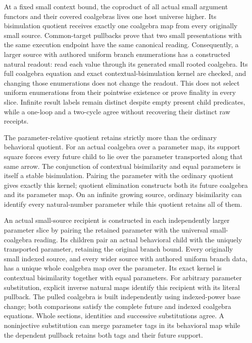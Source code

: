 \documentclass[11pt]{article}
\theoremstyle{definition}
\theoremstyle{remark}
\begin{document}
At a fixed small context bound, the coproduct of all actual small
argument functors and their covered coalgebras lives one host universe
higher.  Its bisimulation quotient receives exactly one coalgebra map
from every originally small source.  Common-target pullbacks prove
that two small presentations with the same execution endpoint have the
same canonical reading.  Consequently, a larger source with authored
uniform branch enumerations has a constructed natural readout: read
each value through its generated small rooted coalgebra.  Its full
coalgebra equation and exact contextual-bisimulation kernel are checked,
and changing those enumerations does not change the readout.  This
does not select uniform enumerations from their pointwise existence or
prove finality in every slice.  Infinite result labels remain distinct
despite empty present child predicates, while a one-loop and a two-cycle
agree without recovering their distinct raw receipts.

The parameter-relative quotient retains strictly more than the ordinary
behavioral quotient.  For an actual coalgebra over a parameter map, its
support square forces every future child to lie over the parameter
transported along that same arrow.  The conjunction of contextual
bisimilarity and equal parameters is itself a stable bisimulation.  Pairing
the parameter with the ordinary quotient gives exactly this kernel;
quotient elimination constructs both its future coalgebra and its parameter
map.  On an infinite growing source, ordinary bisimilarity can identify
every natural-number parameter while this quotient retains all of them.

An actual small-source recipient is constructed in each independently
larger parameter slice by pairing the retained parameter with the universal
small-coalgebra reading.  Its children pair an actual behavioral child with
the uniquely transported parameter, retaining the original branch bound.
Every originally small indexed source, and every wider source with authored
uniform branch data, has a unique whole coalgebra map over the parameter.
Its exact kernel is contextual bisimilarity together with equal parameters.
For arbitrary parameter substitution, explicit inverse natural maps identify
this recipient with its literal pullback.  The pulled coalgebra is built
independently using indexed-power base change; both comparisons satisfy the
complete future and indexed coalgebra equations.  Whole sections, identities
and successive substitutions agree.  A noninjective substitution can merge
parameter tags in its behavioral map while the dependent pullback retains
both tags and their future support.
\end{document}
